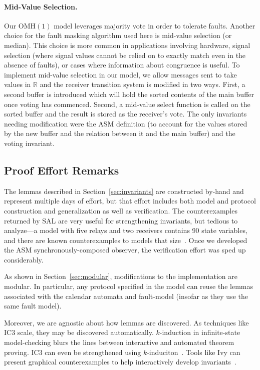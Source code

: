 \documentclass{llncs/llncs}
\newcommand{\OMH}{\ensuremath{\mathrm{OMH}}\xspace}
\begin{document}
{\paragraph{Mid-Value Selection.}
Our $\OMH(1)$ model leverages majority vote in order to tolerate faults. Another choice for the fault masking algorithm used here is mid-value selection (or median). This choice is more common in applications involving hardware, signal selection (where signal values cannot be relied on to exactly match even in the absence of faults), or cases where information about congruence is useful. To implement mid-value selection in our model, we allow messages sent to take values in $\mathbb{R}$ and the receiver transition system is modified in two ways. First, a second buffer is introduced which will hold the sorted contents of the main buffer once voting has commenced. Second, a mid-value select function is called on the sorted buffer and the result is stored as the receiver's vote. The only invariants needing modification were the ASM definition (to account for the values stored by the new buffer and the relation between it and the main buffer) and the voting invariant.


\subsection{Proof Effort Remarks}

The lemmas described in Section~\ref{sec:invariants} are constructed by-hand and represent multiple days of effort, but that effort includes both model and protocol construction and generalization as well as verification. The counterexamples returned by SAL are very useful for strengthening invariants, but tedious to analyze---a model with five relays and two receivers contains 90 state variables, and there are known counterexamples to models that size~\cite{Lincoln-Rushby}. Once we developed the ASM synchronously-composed observer, the verification effort was sped up considerably.

As shown in Section~\ref{sec:modular}, modifications to the implementation are modular. In particular, any protocol specified in the model can reuse the lemmas associated with the calendar automata and fault-model (insofar as they use the same fault model).

Moreover, we are agnostic about how lemmas are discovered. As techniques like IC3 scale, they may be discovered automatically. $k$-induction in infinite-state model-checking blurs the lines between interactive and automated theorem proving. IC3 can even be strengthened using $k$-induciton~\cite{pdr-kind}. Tools like Ivy can present graphical counterexamples to help interactively develop invariants~\cite{ivy}.

}
\end{document}

